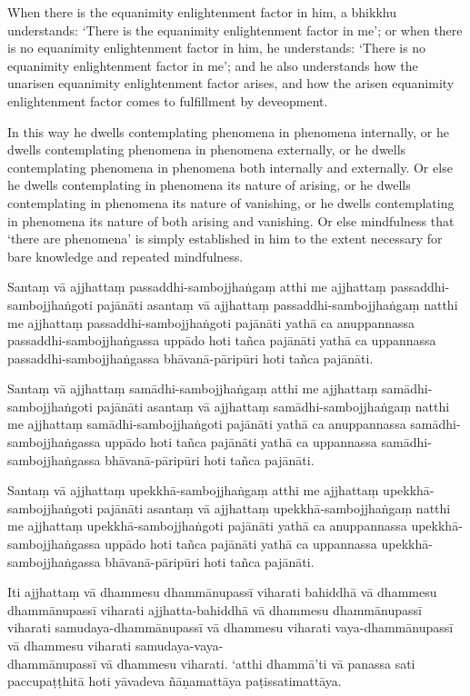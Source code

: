When there is the equanimity enlightenment factor in him, a bhikkhu understands:
`There is the equanimity enlightenment factor in me'; or when there is no
equanimity enlightenment factor in him, he understands: `There is no equanimity
enlightenment factor in me'; and he also understands how the unarisen equanimity
enlightenment factor arises, and how the arisen equanimity enlightenment factor
comes to fulfillment by deveopment.

In this way he dwells contemplating phenomena in phenomena internally, or he
dwells contemplating phenomena in phenomena externally, or he dwells
contemplating phenomena in phenomena both internally and externally. Or else he
dwells contemplating in phenomena its nature of arising, or he dwells
contemplating in phenomena its nature of vanishing, or he dwells contemplating
in phenomena its nature of both arising and vanishing. Or else mindfulness that
‘there are phenomena’ is simply established in him to the extent necessary for
bare knowledge and repeated mindfulness.

\paliPage

Santaṃ vā ajjhattaṃ passaddhi-sambojjhaṅgaṃ atthi me ajjhattaṃ
passaddhi-sambojjhaṅgoti pajānāti asantaṃ vā ajjhattaṃ passaddhi-sambojjhaṅgaṃ
natthi me ajjhattaṃ passaddhi-sambojjhaṅgoti pajānāti yathā ca anuppannassa
passaddhi-sambojjhaṅgassa uppādo hoti tañca pajānāti yathā ca uppannassa
passaddhi-sambojjhaṅgassa bhāvanā-pāripūri hoti tañca pajānāti.

Santaṃ vā ajjhattaṃ samādhi-sambojjhaṅgaṃ atthi me ajjhattaṃ
samādhi-sambojjhaṅgoti pajānāti asantaṃ vā ajjhattaṃ samādhi-sambojjhaṅgaṃ natthi
me ajjhattaṃ samādhi-sambojjhaṅgoti pajānāti yathā ca anuppannassa
samādhi-sambojjhaṅgassa uppādo hoti tañca pajānāti yathā ca uppannassa
samādhi-sambojjhaṅgassa bhāvanā-pāripūri hoti tañca pajānāti.

Santaṃ vā ajjhattaṃ upekkhā-sambojjhaṅgaṃ atthi me ajjhattaṃ
upekkhā-sambojjhaṅgoti pajānāti asantaṃ vā ajjhattaṃ upekkhā-sambojjhaṅgaṃ natthi
me ajjhattaṃ upekkhā-sambojjhaṅgoti pajānāti yathā ca anuppannassa
upekkhā-sambojjhaṅgassa uppādo hoti tañca pajānāti yathā ca uppannassa
upekkhā-sambojjhaṅgassa bhāvanā-pāripūri hoti tañca pajānāti.

Iti ajjhattaṃ vā dhammesu dhammānupassī viharati bahiddhā vā dhammesu
dhammānupassī viharati ajjhatta-bahiddhā vā dhammesu dhammānupassī viharati
samudaya-dhammānupassī vā dhammesu viharati vaya-dhammānupassī vā dhammesu
viharati samudaya-vaya-\\
dhammānupassī vā dhammesu viharati. `atthi dhammā'ti vā
panassa sati paccupaṭṭhitā hoti yāvadeva ñāṇamattāya paṭissatimattāya.

